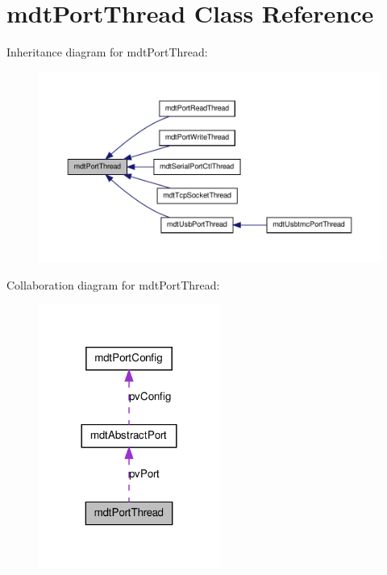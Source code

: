 \hypertarget{classmdt_port_thread}{
\section{mdtPortThread Class Reference}
\label{classmdt_port_thread}
}


Inheritance diagram for mdtPortThread:\nopagebreak
\begin{figure}[H]
\begin{center}
\leavevmode
\includegraphics[width=400pt]{classmdt_port_thread__inherit__graph}
\end{center}
\end{figure}


Collaboration diagram for mdtPortThread:\nopagebreak
\begin{figure}[H]
\begin{center}
\leavevmode
\includegraphics[width=168pt]{classmdt_port_thread__coll__graph}
\end{center}
\end{figure}

